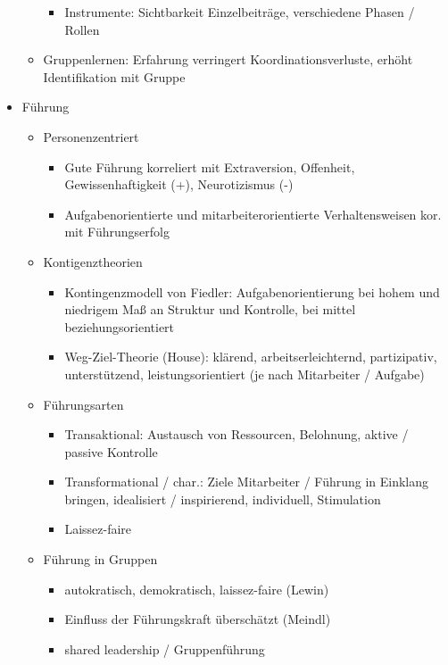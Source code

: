 \documentclass[11pt, paper=a4, twocolumn]{scrartcl}
\begin{document}
\begin{itemize}
\begin{itemize}
\begin{itemize}
							\item Instrumente: Sichtbarkeit Einzelbeiträge, verschiedene Phasen / Rollen
						\end{itemize}
					\item Gruppenlernen: Erfahrung verringert Koordinationsverluste, erhöht Identifikation mit Gruppe
				\end{itemize}
			\item Führung
				\begin{itemize}
					\item Personenzentriert
						\begin{itemize}
							\item Gute Führung korreliert mit Extraversion, Offenheit, Gewissenhaftigkeit (+), 
								Neurotizismus (-)
							\item Aufgabenorientierte und mitarbeiterorientierte Verhaltensweisen kor. mit Führungserfolg
						\end{itemize}
					\item Kontigenztheorien
						\begin{itemize}
							\item Kontingenzmodell von Fiedler: Aufgabenorientierung bei hohem und niedrigem Maß an Struktur 
								und Kontrolle, bei mittel beziehungsorientiert
							\item Weg-Ziel-Theorie (House): klärend, arbeitserleichternd, partizipativ, unterstützend, 
								leistungsorientiert (je nach Mitarbeiter / Aufgabe)
						\end{itemize}
					\item Führungsarten
						\begin{itemize}
							\item Transaktional: Austausch von Ressourcen, Belohnung, aktive / passive Kontrolle
							\item Transformational / char.: Ziele Mitarbeiter / Führung in Einklang bringen, idealisiert / 
								inspirierend, individuell, Stimulation
							\item Laissez-faire
						\end{itemize}
					\item Führung in Gruppen
						\begin{itemize}
							\item autokratisch, demokratisch, laissez-faire (Lewin)
							\item Einfluss der Führungskraft überschätzt (Meindl)
							\item shared leadership / Gruppenführung
						\end{itemize}
				\end{itemize}
		\end{itemize}
\end{document}
